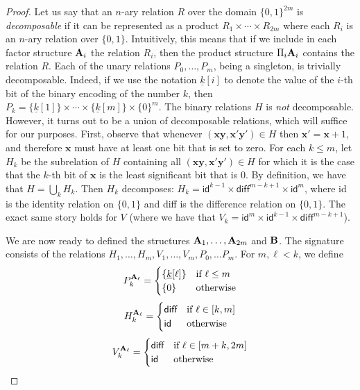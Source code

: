 \documentclass{article}
\newcommand{\aest}{{\bf A}}
\newcommand{\best}{{\bf B}}
\begin{document}
\begin{proof}
Let us say that an $n$-ary relation $R$ over the domain $\{0,1\}^{2m}$ is \emph{decomposable} if it can be represented as a product $R_1\times\cdots\times R_{2m}$ where each $R_i$ is an $n$-ary relation over $\{0,1\}$. Intuitively, this means that
if we include in each factor structure $\aest_i$ the relation $R_i$, then
the product structure $\Pi_i \aest_i$ contains the relation $R$. 
Each of the unary relations $P_0, \ldots, P_m$, being a singleton, is trivially decomposable.
Indeed, if we use the notation $\underline{k}[i]$ to denote the value of the $i$-th bit of the binary encoding of the number $k$, then $P_k = \{\underline{k}[1]\}\times\cdots\times \{\underline{k}[m]\}\times \{0\}^m$.
The binary relations $H$ is \emph{not} decomposable. However, it turns out to be a union of decomposable relations, which will suffice for our purposes. First, observe that whenever $(\textbf{x}\textbf{y},\textbf{x}'\textbf{y}')\in H$ then 
   $\textbf{x}' = \textbf{x}+1$, and therefore $\textbf{x}$ must have at least one bit that is set to zero. For each $k\leq m$, let $H_k$ be the subrelation of $H$ containing all $(\textbf{x}\textbf{y},\textbf{x}'\textbf{y}')\in H$ for which it is the case that 
the $k$-th bit of $\textbf{x}$ is the least significant bit that is 0.
By definition, we have that $H = \bigcup_k H_k$. Then 
    $H_k$ decomposes: $H_k = \textsf{id}^{k-1}\times\textsf{diff}^{m-k+1}\times\textsf{id}^m$,
    where \textsf{id} is the identity relation on $\{0,1\}$ and \textsf{diff} is the difference relation on $\{0,1\}$.
The exact same story holds for $V$
(where we have that $V_k = \textsf{id}^m \times \textsf{id}^{k-1}\times\textsf{diff}^{m-k+1}$).

We are now ready to defined the structures $\aest_1, \ldots, \aest_{2m}$ and $\best$.
The signature consists of the relations $H_1, \ldots, H_m, V_1, \ldots, V_m, P_0, \ldots P_m$. 
    For $m,\ell<k$, we define 
    \[P_k^{\aest_\ell} = \begin{cases} \{\underline{k}[\ell]\} & \text{if $\ell\leq m$} \\
                                                 \{0\} & \text{otherwise} 
                           \end{cases}
   \]
    \[H_k^{\aest_\ell} = \begin{cases} \textsf{diff} & \text{if $\ell\in [k,m]$} \\
                                                  \textsf{id} & \text{otherwise} 
                           \end{cases}
    \]
    \[V_k^{\aest_\ell} = \begin{cases}\textsf{diff} & \text{if $\ell\in [m+k, 2m]$} \\
                                                 \textsf{id} & \text{otherwise} 
                           \end{cases}
    \]


\end{proof}
\end{document}
